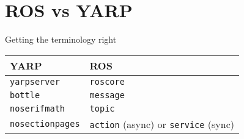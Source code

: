 \documentclass[compress]{beamer}
\begin{document}
\section{ROS vs YARP}


\begin{frame}{Getting the terminology right}
    \begin{table}[]
        \begin{tabularx}{\linewidth}{l>{\raggedright}X}
            \toprule
            \textbf{YARP}			& \textbf{ROS} \tabularnewline
            \midrule
            \texttt{yarpserver}		& \texttt{roscore} \tabularnewline
            \midrule
            \texttt{bottle}		& \texttt{message} \tabularnewline
            \texttt{noserifmath}		& \texttt{topic} \tabularnewline
            \texttt{nosectionpages} & \texttt{action} (async) or \texttt{service} (sync) \tabularnewline
            \bottomrule
        \end{tabularx}
        \label{tab:options}
    \end{table}
\end{frame}
\end{document}
